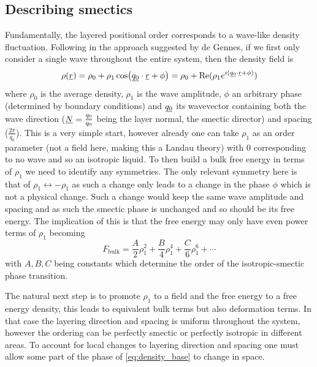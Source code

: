 \documentclass[12pt]{article}
\newcommand{\suf}[2]{\stackunder[0.5pt]{\stackunder[1pt]{\ensuremath{#1}}{\rule{\widthof{\ensuremath{#2}}*\real{0.9}}{.1ex}}}{}}
\newcommand{\su}[1]{\suf{#1}{#1}}
\newcommand{\ssu}[1]{\scriptsize\su{#1}\normalsize}
\begin{document}
    \subsection{Describing smectics\cite{oswaldSmecticColumnarLiquid2005}}\label{sec:intro_degen}
        Fundamentally, the layered positional order corresponds to a wave-like density fluctuation.
        Following \cite{oswaldSmecticColumnarLiquid2005} in the approach suggested by de Gennes, if we first only consider a single wave throughout the entire system, then the density field is
        \begin{equation}\label{eq:density_base}
            \rho(\su{r}) = \rho_0 + \rho_1\cos(\su{q_0}\cdot\su{r} + \phi) = \rho_0 + \Re(\rho_1 e^{i(\ssu{q_0} \cdot \ssu{r} + \phi)})
        \end{equation}
        where $\rho_0$ is the average density, $\rho_1$ is the wave amplitude, $\phi$ an arbitrary phase (determined by boundary conditions) and $\su{q_0}$ its wavevector containing both the wave direction ($\su{N} = \frac{\ssu{q_0}}{q_0}$ being the layer normal, the smectic director) and spacing ($\frac{2\pi}{q_0}$).
        This is a very simple start, however already one can take $\rho_1$ as an order parameter (not a field here, making this a Landau theory) with 0 corresponding to no wave and so an isotropic liquid.
        To then build a bulk free energy in terms of $\rho_1$ we need to identify any symmetries.
        The only relevant symmetry here is that of $\rho_1 \leftrightarrow -\rho_1$ as such a change only leads to a change in the phase $\phi$ which is not a physical change.
        Such a change would keep the same wave amplitude and spacing and as such the smectic phase is unchanged and so should be its free energy.
        The implication of this is that the free energy may only have even power terms of $\rho_1$ becoming
        \begin{equation}
            F_\text{bulk} = \frac{A}{2}\rho_1^2 + \frac{B}{4}\rho_1^4 + \frac{C}{6}\rho_1^6 + \cdots
        \end{equation}
        with $A, B, C$ being constants which determine the order of the isotropic-smectic phase transition\cite{oswaldSmecticColumnarLiquid2005}.

        The natural next step is to promote $\rho_1$ to a field and the free energy to a free energy density, this leads to equivalent bulk terms but also deformation terms.
        In that case the layering direction and spacing is uniform throughout the system, however the ordering can be perfectly smectic or perfectly isotropic in different areas.
        To account for local changes to layering direction and spacing one must allow some part of the phase of \cref{eq:density_base} to change in space.
\end{document}
